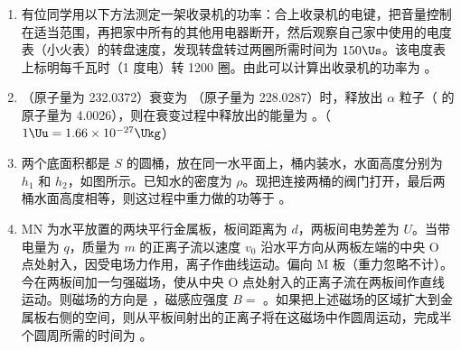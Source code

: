 \documentclass[\gkver]{gaokaozhenti}
\begin{document}
\begin{enumerate}
\item
有位同学用以下方法测定一架收录机的功率：合上收录机的电键，把音量控制在适当范围，再把家中所有的其他用电器断开，然后观察自己家中使用的电度表（小火表）的转盘速度，发现转盘转过两圈所需时间为 $150\Us$。该电度表上标明每千瓦时（1 度电）转 1200 圈。由此可以计算出收录机的功率为 \tkanswer{$40\UW$}。
\jdanswer{
$40\UW$
}

\item
（原子量为 232.0372）衰变为 （原子量为 228.0287）时，释放出 $\alpha$ 粒子（ 的原子量为 4.0026），则在衰变过程中释放出的能量为 。（$1\Uu = 1.66\times10^{-27}\Ukg$）

\item
两个底面积都是 $S$ 的圆桶，放在同一水平面上，桶内装水，水面高度分别为 $h_{1}$ 和 $h_{2}$，如图所示。已知水的密度为 $\rho$。现把连接两桶的阀门打开，最后两桶水面高度相等，则这过程中重力做的功等于 。
\onepicture[align=right, h=3.74cm]{}

\item
MN 为水平放置的两块平行金属板，板间距离为 $d$，两板间电势差为 $U$。当带电量为 $q$，质量为 $m$ 的正离子流以速度 $v_{0}$ 沿水平方向从两板左端的中央 O 点处射入，因受电场力作用，离子作曲线运动。偏向 M 板（重力忽略不计）。今在两板间加一匀强磁场，使从中央 O 点处射入的正离子流在两板间作直线运动。则磁场的方向是 ，磁感应强度 $B =$ 。如果把上述磁场的区域扩大到金属板右侧的空间，则从平板间射出的正离子将在这磁场中作圆周运动，完成半个圆周所需的时间为 。
\onepicture[align=right, w=4.93cm]{}


\end{enumerate}
\end{document}

